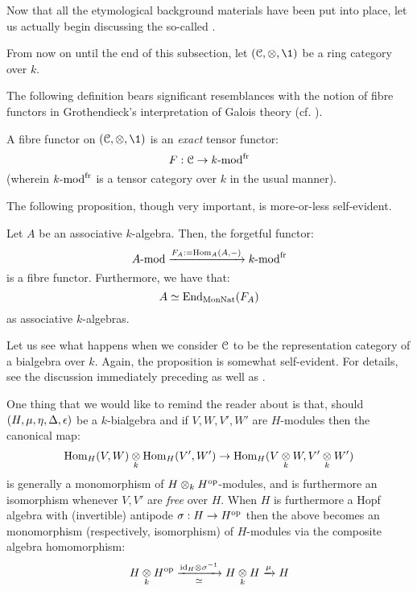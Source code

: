         Now that all the etymological background materials have been put into place, let us actually begin discussing the so-called . 
        \begin{convention}
            From now on until the end of this subsection, let $(\C, \tensor, \1)$ be a ring category over $k$. 
        \end{convention}
        The following definition bears significant resemblances with the notion of fibre functors in Grothendieck's interpretation of Galois theory (cf. \cite[Expos\'e V]{SGA1}).
        \begin{definition} \label{def: fibre_functors}
            A fibre functor on $(\C, \tensor, \1)$ is an \textit{exact} tensor functor:
                $$F: \mathcal{C} \to k\text{-}\mathrm{mod}^{\mathrm{fr}}$$
            (wherein $k\text{-}\mathrm{mod}^{\mathrm{fr}}$ is a tensor category over $k$ in the usual manner).
        \end{definition}
        The following proposition, though very important, is more-or-less self-evident. 
        \begin{proposition} \label{prop: fibre_functors_for_representation_categories_of_associative_algebras}
            Let $A$ be an associative $k$-algebra. Then, the forgetful functor:
                $$A\text{-}\mathrm{mod} \xrightarrow[]{F_A := \mathrm{Hom}_A(A, -)} k\text{-}\mathrm{mod}^{\mathrm{fr}}$$
            is a fibre functor. Furthermore, we have that:
                $$A \simeq \mathrm{End}_{\mathrm{Mon}\mathrm{Nat}}(F_A)$$
            as associative $k$-algebras. 
        \end{proposition}
        Let us see what happens when we consider $\mathcal{C}$ to be the representation category of a bialgebra over $k$. Again, the proposition is somewhat self-evident. For details, see the discussion immediately preceding \cite[Section 5.2]{EGNO} as well as \cite[Section 5.3]{EGNO}.
        \begin{remark}
            One thing that we would like to remind the reader about is that, should $(H, \mu, \eta, \Delta, \epsilon)$ be a $k$-bialgebra and if $V, W, V', W'$ are $H$-modules then the canonical map:
                $$\Hom_H(V, W) \tensor_k \Hom_H(V', W') \to \Hom_H(V \tensor_k W, V' \tensor_k W')$$
            is generally a monomorphism of $H \tensor_k H^{\op}$-modules, and is furthermore an isomorphism whenever $V, V'$ are \textit{free} over $H$. When $H$ is furthermore a Hopf algebra with (invertible) antipode $\sigma: H \to H^{\mathrm{op}}$ then the above becomes an monomorphism (respectively, isomorphism) of $H$-modules via the composite algebra homomorphism:
                $$H \tensor_k H^{\op} \xrightarrow[\cong]{\id_H \tensor \sigma^{-1}} H \tensor_k H \xrightarrow[]{\mu} H$$
        \end{remark}
